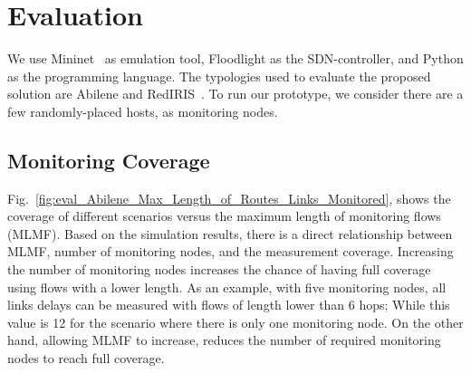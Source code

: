 \documentclass[10pt, journal, letterpaper]{IEEEtran}
\begin{document}
\section{Evaluation}\label{sec:evaluation}
We use Mininet~\cite{kaur2014mininet} as emulation tool, Floodlight as the SDN-controller, and Python as the programming language. The typologies used to evaluate the proposed solution are Abilene and RedIRIS~\cite{topologyzoo}. To run our prototype, we consider there are a few randomly-placed hosts, as monitoring nodes. %



\subsection{Monitoring Coverage}\label{subsec:eval_coverage}
Fig.~\ref{fig:eval_Abilene_Max_Length_of_Routes_Links_Monitored}, shows the coverage of different scenarios versus the maximum length of monitoring flows (MLMF). Based on the simulation results, there is a direct relationship between MLMF, number of monitoring nodes, and the measurement coverage. Increasing the number of monitoring nodes increases the chance of having full coverage using flows with a lower length. As an example, with five monitoring nodes, all links delays can be measured with flows of length lower than 6 hops; While this value is 12 for the scenario where there is only one monitoring node.
On the other hand, allowing MLMF to increase, reduces the number of required monitoring nodes to reach full coverage. 
\end{document}
